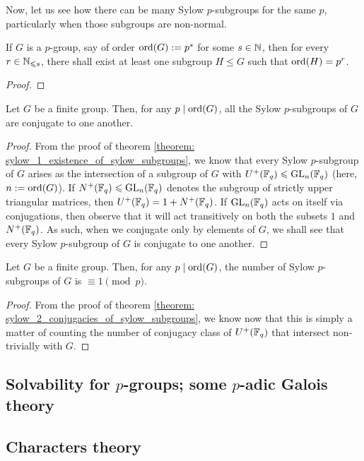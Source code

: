         Now, let us see how there can be many Sylow $p$-subgroups for the same $p$, particularly when those subgroups are non-normal.
        \begin{lemma} \label{lemma: subgroups_of_p_groups}
            If $G$ is a $p$-group, say of order $\operatorname{ord}(G) := p^s$ for some $s \in \mathbb{N}$, then for every $r \in \mathbb{N}_{\leqslant s}$, there shall exist at least one subgroup $H \leq G$ such that $\operatorname{ord}(H) = p^r$.
        \end{lemma}
            \begin{proof}
                
            \end{proof}
        \begin{theorem} \label{theorem: sylow_2_conjugacies_of_sylow_subgroups}
            Let $G$ be a finite group. Then, for any $p \mid \operatorname{ord}(G)$, all the Sylow $p$-subgroups of $G$ are conjugate to one another. 
        \end{theorem}
            \begin{proof}
                From the proof of theorem \ref{theorem: sylow_1_existence_of_sylow_subgroups}, we know that every Sylow $p$-subgroup of $G$ arises as the intersection of a subgroup of $G$ with $U^+(\mathbb{F}_q) \leqslant \mathrm{GL}_n(\mathbb{F}_q)$ (here, $n := \operatorname{ord}(G)$). If $N^+(\mathbb{F}_q) \leqslant \mathrm{GL}_n(\mathbb{F}_q)$ denotes the subgroup of strictly upper triangular matrices, then $U^+(\mathbb{F}_q) = 1 + N^+(\mathbb{F}_q)$. If $\mathrm{GL}_n(\mathbb{F}_q)$ acts on itself via conjugations, then observe that it  will act transitively on both the subsets $1$ and $N^+(\mathbb{F}_q)$. As such, when we conjugate only by elements of $G$, we shall see that every Sylow $p$-subgroup of $G$ is conjugate to one another.
            \end{proof}

        \begin{theorem} \label{theorem: sylow_3_number_of_sylow_subgroups}
            Let $G$ be a finite group. Then, for any $p \mid \operatorname{ord}(G)$, the number of Sylow $p$-subgroups of $G$ is $\equiv 1 \pmod{p}$.
        \end{theorem}
            \begin{proof}
                From the proof of theorem \ref{theorem: sylow_2_conjugacies_of_sylow_subgroups}, we know now that this is simply a matter of counting the number of conjugacy class of $U^+(\mathbb{F}_q)$ that intersect non-trivially with $G$.
            \end{proof}

    \subsection{Solvability for \texorpdfstring{$p$}{}-groups; some \texorpdfstring{$p$}{}-adic Galois theory}

    \subsection{Characters theory}
